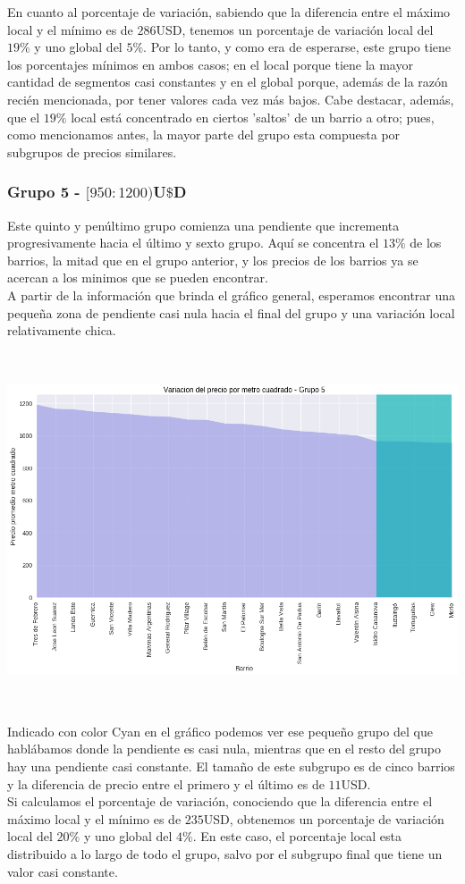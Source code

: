 \documentclass[a4paper, 10pt]{article}
\newcommand\tab[1][0.5cm]{\hspace*{#1}}
\begin{document}
				  	\tab En cuanto al porcentaje de variación, sabiendo que la diferencia entre el máximo local y el mínimo es de
				  	$286$USD, tenemos un porcentaje de variación local del $19\%$ y uno global del $5\%$. Por lo tanto, y como era
				  	de esperarse, este grupo tiene los porcentajes mínimos en ambos casos; en el local porque tiene la mayor cantidad
				  	de segmentos casi constantes y en el global porque, además de la razón recién mencionada, por tener valores
				  	cada vez más bajos. Cabe destacar, además, que el $19\%$ local está concentrado en ciertos 'saltos' de un
				  	barrio a otro; pues, como mencionamos antes, la mayor parte del grupo esta compuesta por subgrupos de precios
				  	similares.
				\subsubsection{Grupo 5 - $[950:1200)$U$\$$D}
					Este quinto y penúltimo grupo comienza una pendiente que incrementa progresivamente hacia el último y sexto
					grupo. Aquí se concentra el $13\%$ de los barrios, la mitad que en el grupo anterior, y los precios de los
					barrios ya se acercan a los minimos que se pueden encontrar.\\
					\tab A partir de la información que brinda el gráfico general, esperamos encontrar una pequeña zona de pendiente
					casi nula hacia el final del grupo y una variación local relativamente chica.
					\begin{center}
   		    				\includegraphics[width=6in, height=4.13in]{images/m2Group5Area}
				  	\end{center}
				  	\tab Indicado con color Cyan en el gráfico podemos ver ese pequeño grupo del que hablábamos donde la pendiente
				  	es casi nula, mientras que en el resto del grupo hay una pendiente casi constante. El tamaño de este subgrupo
				  	es de cinco barrios y la diferencia de precio entre el primero y el último es de $11$USD. \\
				  	\tab Si calculamos el porcentaje de variación, conociendo que la diferencia entre el máximo local y el mínimo
				  	es de $235$USD, obtenemos un porcentaje de variación local del $20\%$ y uno global del $4\%$. En este caso, el
				  	porcentaje local esta distribuido a lo largo de todo el grupo, salvo por el subgrupo final que tiene un valor
				  	casi constante.
\end{document}
